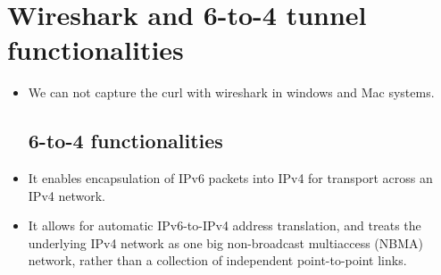 \section{Wireshark and 6-to-4 tunnel functionalities}
\begin{itemize}
\item We can not capture the curl with wireshark in windows and Mac systems.
\subsection{6-to-4 functionalities}
\item It enables encapsulation of IPv6 packets into IPv4 for transport across an IPv4 network.
\item It allows for automatic IPv6-to-IPv4 address translation, and treats the underlying IPv4 network as one big non-broadcast multiaccess (NBMA) network, rather than a collection of independent point-to-point links.
\end{itemize}
